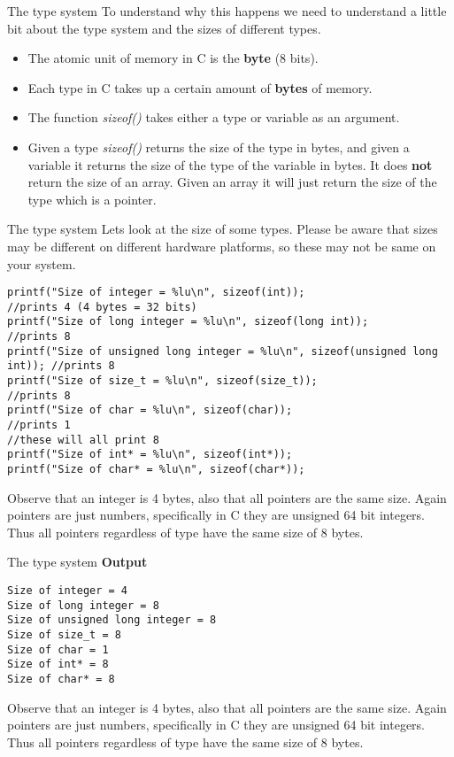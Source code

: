 \documentclass[10pt]{beamer}
\begin{document}
\begin{frame}[fragile]{The type system}
To understand why this happens we need to understand a little bit about the type system and the sizes of different types.
\begin{itemize}
	\item The atomic unit of memory in C is the {\bf byte} (8 bits).
	\item Each type in C takes up a certain amount of {\bf bytes} of memory.
	\item The function {\it sizeof()} takes either a type or variable as an argument.
	\item Given a type {\it sizeof()} returns the size of the type in bytes, and given a variable it returns the size of the type of the variable in bytes. It does {\bf not} return the size of an array. Given an array it will just return the size of the type which is a pointer.
\end{itemize}
\end{frame}

\begin{frame}[fragile]{The type system}
Lets look at the size of some types. Please be aware that sizes may be different on different hardware platforms, so these may not be same on your system.

\begin{verbatim}
printf("Size of integer = %lu\n", sizeof(int));                             //prints 4 (4 bytes = 32 bits)
printf("Size of long integer = %lu\n", sizeof(long int));                   //prints 8
printf("Size of unsigned long integer = %lu\n", sizeof(unsigned long int)); //prints 8
printf("Size of size_t = %lu\n", sizeof(size_t));                           //prints 8
printf("Size of char = %lu\n", sizeof(char));                               //prints 1
//these will all print 8
printf("Size of int* = %lu\n", sizeof(int*));
printf("Size of char* = %lu\n", sizeof(char*));
\end{verbatim}
Observe that an integer is 4 bytes, also that all pointers are the same size. Again pointers are just numbers, specifically in C they are unsigned 64 bit integers. Thus all pointers regardless of type have the same size of 8 bytes.
\end{frame}

\begin{frame}[fragile]{The type system}
{\bf Output}
\begin{verbatim}
Size of integer = 4
Size of long integer = 8
Size of unsigned long integer = 8
Size of size_t = 8
Size of char = 1
Size of int* = 8
Size of char* = 8
\end{verbatim}
Observe that an integer is 4 bytes, also that all pointers are the same size. Again pointers are just numbers, specifically in C they are unsigned 64 bit integers. Thus all pointers regardless of type have the same size of 8 bytes.
\end{frame}
\end{document}
